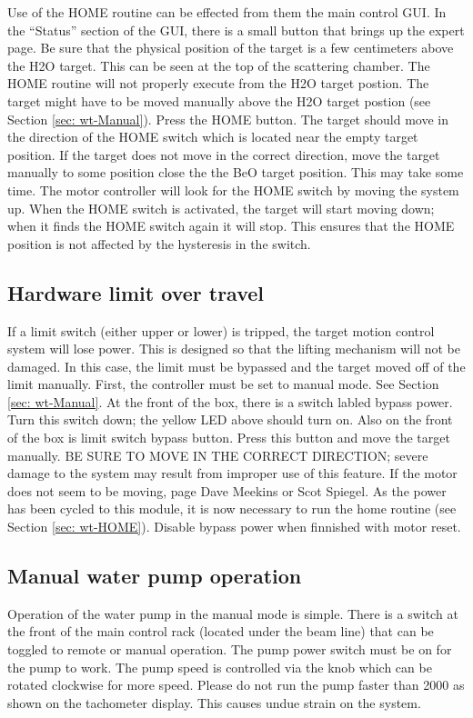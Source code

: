 {Use of the HOME routine can be effected from them the main control
GUI. In the {}``Status'' section of the GUI, there is a small button
that brings up the expert page. Be sure that the physical position
of the target is a few centimeters above the H2O target. This can
be seen at the top of the scattering chamber. The HOME routine will
not properly execute from the H2O target postion. The target might
have to be moved manually above the H2O target postion (see Section
\ref{sec: wt-Manual}). Press the HOME button. The target should move
in the direction of the HOME switch which is located near the empty
target position. If the target does not move in the correct direction,
move the target manually to some position close the the BeO target
position. This may take some time. The motor controller will look
for the HOME switch by moving the system up. When the HOME switch
is activated, the target will start moving down; when it finds the
HOME switch again it will stop. This ensures that the HOME position
is not affected by the hysteresis in the switch.


\subsection{Hardware limit over travel}

If a limit switch (either upper or lower) is tripped, the target motion
control system will lose power. This is designed so that the lifting
mechanism will not be damaged. In this case, the limit must be bypassed
and the target moved off of the limit manually. First, the controller
must be set to manual mode. See Section \ref{sec: wt-Manual}. At the
front of the box, there is a switch labled bypass power. Turn this
switch down; the yellow LED above should turn on. Also on the front
of the box is limit switch bypass button. Press this button and move
the target manually. BE SURE TO MOVE IN THE CORRECT DIRECTION; severe
damage to the system may result from improper use of this feature.
If the motor does not seem to be moving, page Dave Meekins or Scot
Spiegel. As the power has been cycled to this module, it is now necessary
to run the home routine (see Section \ref{sec: wt-HOME}). Disable bypass
power when finnished with motor reset.


\subsection{Manual water pump operation}

Operation of the water pump in the manual mode is simple. There is
a switch at the front of the main control rack (located under the
beam line) that can be toggled to remote or manual operation. The
pump power switch must be on for the pump to work. The pump speed
is controlled via the knob which can be rotated clockwise for more
speed. Please do not run the pump faster than 2000 as shown on the
tachometer display. This causes undue strain on the system.

}
